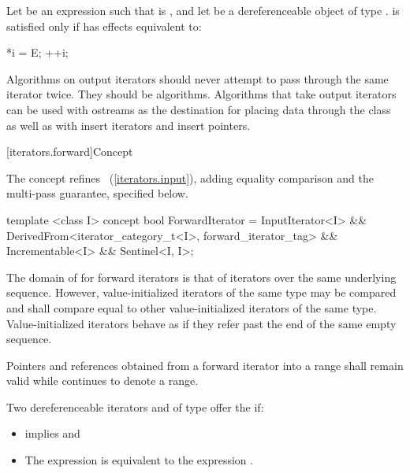 \pnum
Let  be an expression such that  is , and let  be a
dereferenceable object of type .  is satisfied only if
 has effects equivalent to:
\begin{codeblock}
  *i = E;
  ++i;
\end{codeblock}

\pnum
\enternote
Algorithms on output iterators should never attempt to pass through the same iterator twice.
They should be
algorithms.
Algorithms that take output iterators can be used with ostreams as the destination
for placing data through the
class as well as with insert iterators and insert pointers.
\exitnote

[iterators.forward]{Concept }

\pnum
The  concept refines ~(\ref{iterators.input}),
adding equality comparison and the multi-pass guarantee, specified below.

%
\begin{codeblock}
  template <class I>
  concept bool ForwardIterator =
    InputIterator<I> &&
    DerivedFrom<iterator_category_t<I>, forward_iterator_tag> &&
    Incrementable<I> &&
    Sentinel<I, I>;
\end{codeblock}

\pnum
The domain of \tcode{==} for forward iterators is that of iterators over the same
underlying sequence. However, value-initialized iterators of the same type
may be compared and shall compare equal to other value-initialized iterators of the same type.
\enternote Value-initialized iterators behave as if they refer past the end of
the same empty sequence. \exitnote

\pnum
Pointers and references obtained from a forward iterator into a range 
shall remain valid while  continues to denote a range.

\pnum
Two dereferenceable iterators  and  of type  offer the
 if:

\begin{itemize}
\item {} implies  and
\item The expression
 is equivalent to the expression .
\end{itemize}

